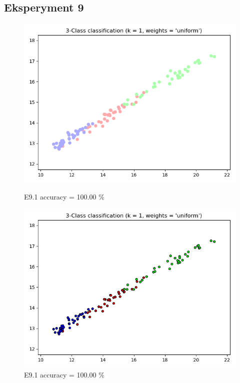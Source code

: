 \documentclass{classrep}
\begin{document}
	\subsection{Eksperyment 9}
		\begin{figure}[H]
			\begin{minipage}{0.5\linewidth}
				\centering
				\includegraphics[scale=0.25]{KNN_seed_9_1.png}
				\caption{E9.1 accuracy = 100.00 \%}
			\end{minipage}
			\begin{minipage}{0.5\linewidth}
				\centering
				\includegraphics[scale=0.25]{KNN_seed_9_2.png}
				\caption{E9.1 accuracy = 100.00 \%}
				\label{E9.1}
			\end{minipage}

\end{figure}
\end{document}
